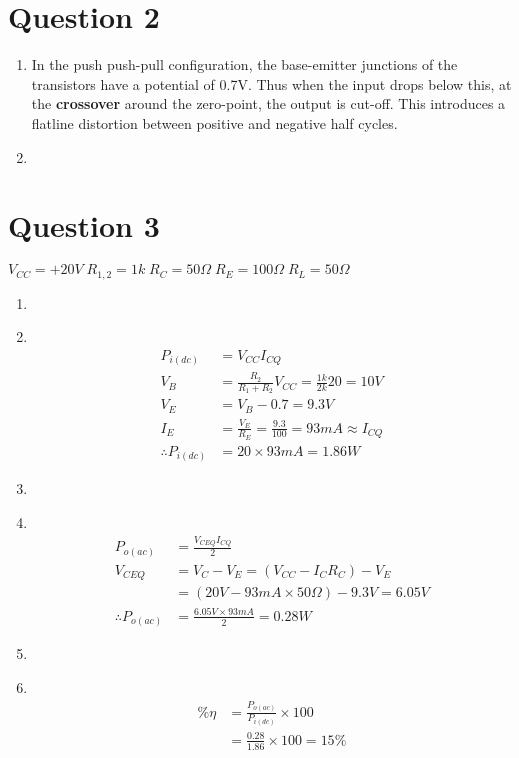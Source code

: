 \documentclass[11pt]{article}
\newcommand\Item[1][]{%
  \ifx\relax#1\relax  \item \else \item[#1] \fi
  \abovedisplayskip=0pt\abovedisplayshortskip=0pt~\vspace*{-\baselineskip}}
\begin{document}
  \section*{Question 2}
  \begin{enumerate}[label=\alph*)]
    \item %
    In the push push-pull configuration, the base-emitter junctions of the transistors have a potential of 0.7V. Thus when the input drops below this, at the \textbf{crossover} around the zero-point, the output is cut-off. This introduces a flatline distortion between positive and negative half cycles.
    
    \item %
    
    
  \end{enumerate}
  
\newpage
\section*{Question 3}
  $V_{CC} = +20V \; R_{1,2} = 1k \; R_C = 50\Omega \; R_E = 100\Omega \; R_L = 50\Omega$

  \begin{enumerate}[label=\roman*)]
    \Item %
    \begin{align*}
      P_{i(dc)} &= V_{CC}I_{CQ} \\
      V_{B} &= \frac{R_{2}}{R_{1}+R_{2}}V_{CC} = \frac{1k}{2k}20 = 10V \\
      V_{E} &= V_{B} - 0.7 = 9.3V \\
      I_{E} &= \frac{V_{E}}{R_{E}} = \frac{9.3}{100} = 93mA \approx I_{CQ} \\
      \therefore P_{i(dc)} &= 20 \times 93mA = 1.86W
    \end{align*}

    \Item %
    \begin{align*}
      P_{o(ac)} &= \frac{V_{CEQ}I_{CQ}}{2} \\
      V_{CEQ}   &= V_{C} - V_{E} = (V_{CC} - I_{C}R_{C}) - V_{E} \\
                &= (20V - 93mA \times 50\Omega) - 9.3V = 6.05V \\ 
      \therefore P_{o(ac)} &= \frac{6.05V \times 93mA}{2} = 0.28W
    \end{align*}

    \Item %
    \begin{align*}
      \% \eta &= \frac{P_{o(ac)}}{P_{i(dc)}} \times 100 \\
              &= \frac{0.28}{1.86} \times 100 = 15\% 
    \end{align*}
  \end{enumerate}
\end{document}
